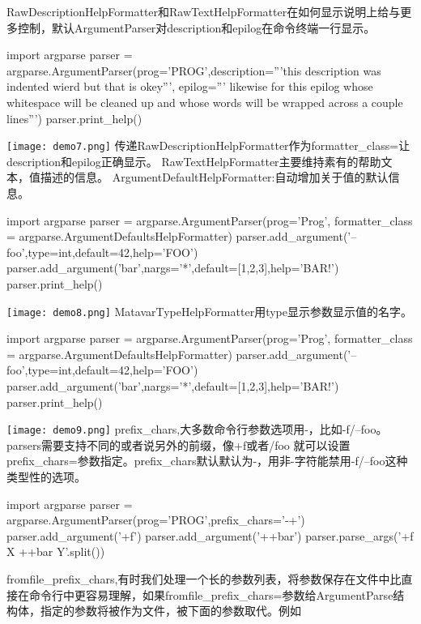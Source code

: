RawDescriptionHelpFormatter和RawTextHelpFormatter在如何显示说明上给与更多控制，默认ArgumentParser对description和epilog在命令终端一行显示。
\begin{python}
import argparse
parser = argparse.ArgumentParser(prog='PROG',description='''this
 description was indented wierd
but that is okey''',
epilog='''
likewise for this epilog whose whitespace will be
cleaned up and whose words will be wrapped
across a couple lines''')
parser.print_help()
\end{python}
\texttt{[image: demo7.png]}\newline
传递RawDescriptionHelpFormatter作为formatter\_class=让description和epilog正确显示。
RawTextHelpFormatter主要维持素有的帮助文本，值描述的信息。\newline
ArgumentDefaultHelpFormatter:自动增加关于值的默认信息。\newline
\begin{python}
import argparse
parser = argparse.ArgumentParser(prog='Prog',
formatter_class = argparse.ArgumentDefaultsHelpFormatter)
parser.add_argument('--foo',type=int,default=42,help='FOO')
parser.add_argument('bar',nargs='*',default=[1,2,3],help='BAR!')
parser.print_help()
\end{python}
\texttt{[image: demo8.png]}
MatavarTypeHelpFormatter用type显示参数显示值的名字。
\begin{python}
import argparse
parser = argparse.ArgumentParser(prog='Prog',
formatter_class = argparse.ArgumentDefaultsHelpFormatter)
parser.add_argument('--foo',type=int,default=42,help='FOO')
parser.add_argument('bar',nargs='*',default=[1,2,3],help='BAR!')
parser.print_help()
\end{python}
\texttt{[image: demo9.png]}\newline
prefix\_chars,大多数命令行参数选项用-，比如-f/--foo。parsers需要支持不同的或者说另外的前缀，像+f或者/foo
就可以设置prefix\_chars=参数指定。prefix\_chars默认默认为-，用非-字符能禁用-f/--foo这种类型性的选项。\newline
\begin{python}
import argparse
parser = argparse.ArgumentParser(prog='PROG',prefix_chars='-+')
parser.add_argument('+f')
parser.add_argument('++bar')
parser.parse_args('+f X ++bar Y'.split())

\end{python}
fromfile\_prefix\_chars,有时我们处理一个长的参数列表，将参数保存在文件中比直接在命令行中更容易理解，如果fromfile\_prefix\_chars=参数给ArgumentParse结构体，指定的参数将被作为文件，被下面的参数取代。例如
